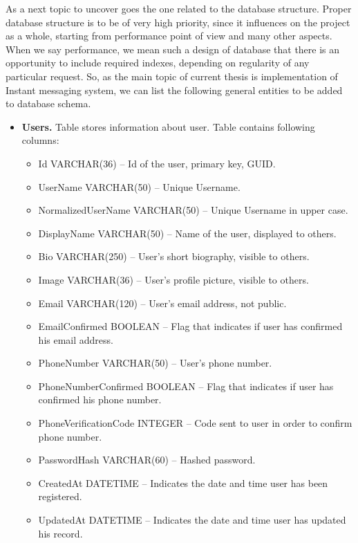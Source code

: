 As a next topic to uncover goes the one related to the database structure.
Proper database structure is to be of very high priority, since it influences on the project as a whole,
starting from performance point of view and many other aspects.
When we say performance, we mean such a design of database that there is an opportunity to include required indexes,
depending on regularity of any particular request.
So, as the main topic of current thesis is implementation of Instant messaging system, we can list the following
general entities to be added to database schema.

\begin{itemize}
    \item \textbf{Users.} Table stores information about user.
    Table contains following columns:
    \begin{itemize}
        \item Id VARCHAR(36) -- Id of the user, primary key, GUID\@.
        \item UserName VARCHAR(50) -- Unique Username.
        \item NormalizedUserName VARCHAR(50) -- Unique Username in upper case.
        \item DisplayName VARCHAR(50) -- Name of the user, displayed to others.
        \item Bio VARCHAR(250) -- User's short biography, visible to others.
        \item Image VARCHAR(36) -- User's profile picture, visible to others.
        \item Email VARCHAR(120) -- User's email address, not public.
        \item EmailConfirmed BOOLEAN -- Flag that indicates if user has confirmed his email address.
        \item PhoneNumber VARCHAR(50) -- User's phone number.
        \item PhoneNumberConfirmed BOOLEAN -- Flag that indicates if user has confirmed his phone number.
        \item PhoneVerificationCode INTEGER -- Code sent to user in order to confirm phone number.
        \item PasswordHash VARCHAR(60) -- Hashed password.
        \item CreatedAt DATETIME -- Indicates the date and time user has been registered.
        \item UpdatedAt DATETIME -- Indicates the date and time user has updated his record.
    \end{itemize}

\end{itemize}
